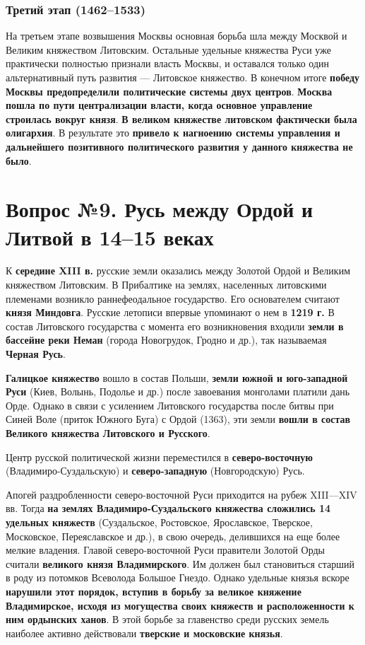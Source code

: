 \documentclass{article}
\begin{document}
\subsubsection{Третий этап (1462–1533)}

На третьем этапе возвышения Москвы основная борьба шла между Москвой и Великим княжеством Литовским. Остальные удельные княжества Руси уже практически полностью признали власть Москвы, и оставался только один альтернативный путь развития — Литовское княжество. В конечном итоге \textbf{победу Москвы предопределили политические системы двух центров}. \textbf{Москва пошла по пути централизации власти, когда основное управление строилась вокруг князя}. \textbf{В великом княжестве литовском фактически была олигархия}. В результате это \textbf{привело к нагноению системы управления и дальнейшего позитивного политического развития у данного княжества не было}.

\pagebreak
\section{Вопрос №9. Русь между Ордой и Литвой в 14–15 веках}

К \textbf{середине XIII в.} русские земли оказались между Золотой Ордой и Великим княжеством Литовским. В Прибалтике на землях, населенных литовскими племенами возникло раннефеодальное государство. Его основателем считают \textbf{князя Миндовга}. Русские летописи впервые упоминают о нем в \textbf{1219 г.} В состав Литовского государства с момента его возникновения входили \textbf{земли в бассейне реки Неман} (города Новогрудок, Гродно и др.), так называемая \textbf{Черная Русь}.

\hfill

\textbf{Галицкое княжество} вошло в состав Польши, \textbf{земли южной и юго-западной Руси} (Киев, Волынь, Подолье и др.) после завоевания монголами платили дань Орде. Однако в связи с усилением Литовского государства после битвы при Синей Воле (приток Южного Буга) с Ордой (1363), эти земли \textbf{вошли в состав Великого княжества Литовского и Русского}.

\hfill

Центр русской политической жизни переместился в \textbf{северо-восточную} (Владимиро-Суздальскую) и \textbf{северо-западную} (Новгородскую) Русь.

\hfill

Апогей раздробленности северо-восточной Руси приходится на рубеж XIII—XIV вв. Тогда \textbf{на землях Владимиро-Суздальского княжества сложились 14 удельных княжеств} (Суздальское, Ростовское, Ярославское, Тверское, Московское, Переяславское и др.), в свою очередь, делившихся на еще более мелкие владения. Главой северо-восточной Руси правители Золотой Орды считали \textbf{великого князя Владимирского}. Им должен был становиться старший в роду из потомков Всеволода Большое Гнездо. Однако удельные князья вскоре \textbf{нарушили этот порядок, вступив в борьбу за великое княжение Владимирское, исходя из могущества своих княжеств и расположенности к ним ордынских ханов}. В этой борьбе за главенство среди русских земель наиболее активно действовали \textbf{тверские и московские князья}.
\end{document}
